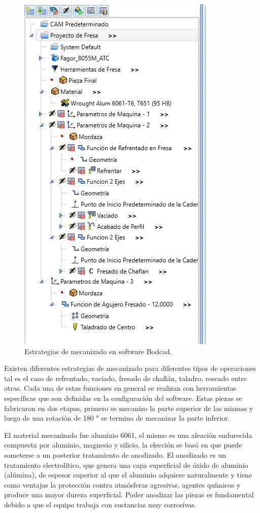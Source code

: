 \begin{figure}[ht]
	\centering
	\includegraphics[width=.6\textwidth]{./Figures/3d_estrategia.png}
	\caption{Estrategias de mecanizado en software Bodcad.}
	\label{fig:estrategia}
\end{figure}

Existen diferentes estrategias de mecanizado para diferentes tipos de operaciones tal es el caso de refrentado, vaciado, fresado de chaflán, taladro, roscado entre otras. Cada una de estas funciones en general se realizan con herramientas específicas que son definidas en la configuración del software.
Estas piezas se fabricaron en dos etapas, primero se mecanizo la parte superior de las mismas y luego de una rotación de  180 ° se termino de mecanizar la parte inferior.

El material mecanizado fue aluminio 6061, el mismo es una aleación endurecida compuesta por aluminio, magnesio y silicio, la elección se basó en que puede someterse a un posterior tratamiento de anodizado. El anodizado es un tratamiento electrolítico, que genera una capa superficial de óxido de aluminio (alúmina), de espesor superior al que el aluminio adquiere naturalmente y tiene como ventajas la protección contra atmósferas agresivas, agentes químicos y produce una mayor dureza superficial.
Poder anodizar las piezas es fundamental debido a que el equipo trabaja con sustancias muy corrosivas. 



